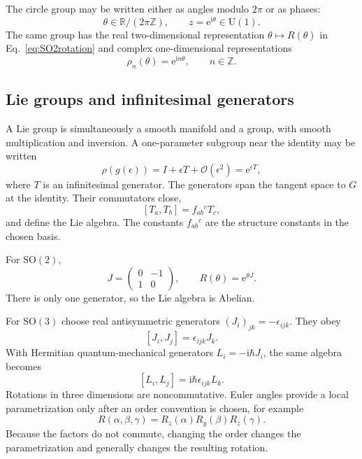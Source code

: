 \documentclass[11pt]{article}
\newcommand{\e}{\mathrm{e}}
\newcommand{\ii}{\mathrm{i}}
\newcommand{\R}{\mathbb{R}}
\newcommand{\comm}[2]{\left[#1,#2\right]}
\newcommand{\SO}{\mathrm{SO}}
\newcommand{\UU}{\mathrm{U}}
\begin{document}
The circle group may be written either as angles modulo $2\pi$ or as phases:
\begin{equation}
  \theta\in\R/(2\pi\mathbb Z),
  \qquad
  z=\e^{\ii\theta}\in\UU(1).
  \label{eq:circleU1}
\end{equation}
The same group has the real two-dimensional representation
$\theta\mapsto R(\theta)$ in Eq.~\eqref{eq:SO2rotation} and complex
one-dimensional representations
\begin{equation}
  \rho_n(\theta)=\e^{\ii n\theta},
  \qquad n\in\mathbb Z.
  \label{eq:U1irreps}
\end{equation}

\subsection{Lie groups and infinitesimal generators}

A Lie group is simultaneously a smooth manifold and a group, with smooth
multiplication and inversion.  A one-parameter subgroup near the identity may
be written
\begin{equation}
  \rho(g(\epsilon))
  =I+\epsilon T+\mathcal O(\epsilon^2)
  =\e^{\epsilon T},
  \label{eq:oneparametergroup}
\end{equation}
where $T$ is an infinitesimal generator.  The generators span the tangent
space to $G$ at the identity.  Their commutators close,
\begin{equation}
  \comm{T_a}{T_b}=f_{ab}{}^cT_c,
  \label{eq:liealgebra}
\end{equation}
and define the Lie algebra.  The constants $f_{ab}{}^c$ are the structure
constants in the chosen basis.

For $\SO(2)$,
\begin{equation}
  J=
  \begin{pmatrix}0&-1\\1&0\end{pmatrix},
  \qquad
  R(\theta)=\e^{\theta J}.
  \label{eq:SO2generator}
\end{equation}
There is only one generator, so the Lie algebra is Abelian.

For $\SO(3)$ choose real antisymmetric generators $(J_i)_{jk}=-\epsilon_{ijk}$.
They obey
\begin{equation}
  \comm{J_i}{J_j}=\epsilon_{ijk}J_k.
  \label{eq:SO3realalgebra}
\end{equation}
With Hermitian quantum-mechanical generators $L_i=-\ii\hbar J_i$, the same
algebra becomes
\begin{equation}
  \comm{L_i}{L_j}=\ii\hbar\epsilon_{ijk}L_k.
  \label{eq:angularmomentumalgebra}
\end{equation}
Rotations in three dimensions are noncommutative.  Euler angles provide a
local parametrization only after an order convention is chosen, for example
\begin{equation}
  R(\alpha,\beta,\gamma)
  =R_z(\alpha)R_y(\beta)R_z(\gamma).
  \label{eq:Eulerangles}
\end{equation}
Because the factors do not commute, changing the order changes the
parametrization and generally changes the resulting rotation.
\end{document}
